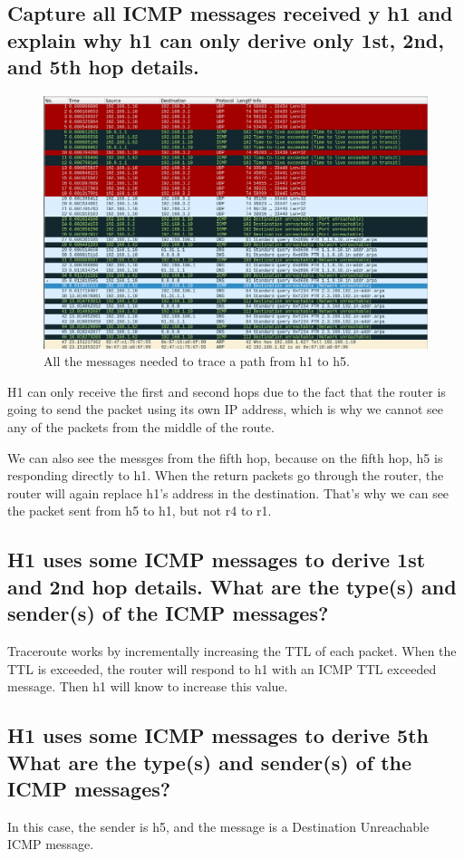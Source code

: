 \documentclass{article}
\begin{document}
\subsection{Capture all ICMP messages received y h1 and explain why h1 can only derive only
1st, 2nd, and 5th hop details.}
\begin{figure}[h]
		\centering
		\includegraphics[scale=0.3]{traceroute.png}
		\caption{All the messages needed to trace a path from h1 to h5.}
\end{figure}
H1 can only receive the first and second hops due to the fact that the router
is going to send the packet using its own IP address, which is why we cannot see
any of the packets from the middle of the route.

We can also see the messges from the fifth hop, because on the fifth hop, 
h5 is responding directly to h1. 
When the return packets go through the router, the router will again replace h1's 
address in the destination.
That's why we can see the packet sent from h5 to h1, but not r4 to r1. 
\subsection{H1 uses some ICMP messages to derive 1st and 2nd hop details.
What are the type(s) and sender(s) of the ICMP messages?}
Traceroute works by incrementally increasing the TTL of each packet. 
When the TTL is exceeded, the router will respond to h1 with an ICMP TTL exceeded
message.
Then h1 will know to increase this value.

\subsection{H1 uses some ICMP messages to derive 5th
What are the type(s) and sender(s) of the ICMP messages?}
In this case, the sender is h5, and the message is a Destination Unreachable ICMP message.
\end{document}
